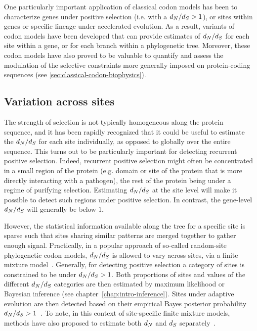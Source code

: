 One particularly important application of classical codon models has been to characterize genes under positive selection (i.e. with a $d_N / d_S > 1$), or sites within genes or specific lineage under accelerated evolution.
As a result, variants of codon models have been developed that can provide estimates of $d_N / d_S$ for each site within a gene, or for each branch within a phylogenetic tree.
Moreover, these codon models have also proved to be valuable to quantify and assess the modulation of the selective constraints more generally imposed on protein-coding sequences (see \ref{sec:classical-codon-biophysics}).

\subsection{Variation across sites}
\label{subsec:variation-across-sites}

The strength of selection is not typically homogeneous along the protein sequence, and it has been rapidly recognized that it could be useful to estimate the $d_N / d_S$ for each site individually, as opposed to globally over the entire sequence.
This turns out to be particularly important for detecting recurrent positive selection.
Indeed, recurrent positive selection might often be concentrated in a small region of the protein (e.g. domain or site of the protein that is more directly interacting with a pathogen), the rest of the protein being under a regime of purifying selection.
Estimating $d_N / d_S$ at the site level will make it possible to detect such regions under positive selection.
In contrast, the gene-level $d_N / d_S$ will generally be below $1$.

However, the statistical information available along the tree for a specific site is sparse such that sites sharing similar patterns are merged together to gather enough signal.
Practically, in a popular approach of so-called random-site phylogenetic codon models, $d_N / d_S$ is allowed to vary across sites, via a finite mixture model~\citep{Nielsen1998, Yang2000, Yang2005, Huelsenbeck2006}.
Generally, for detecting positive selection a category of sites is constrained to be under $d_N / d_S > 1$.
Both proportions of sites and values of the different $d_N / d_S$ categories are then estimated by maximum likelihood or Bayesian inference (see chapter~\ref{chap:intro-inference}).
Sites under adaptive evolution are then detected based on their empirical Bayes posterior probability $d_N / d_S > 1$~\citep{Huelsenbeck2004,Yang2005}.
To note, in this context of site-specific finite mixture models, methods have also proposed to estimate both $d_N$ and $d_S$ separately~\citep{Pond2005a, Spielman2016}.

